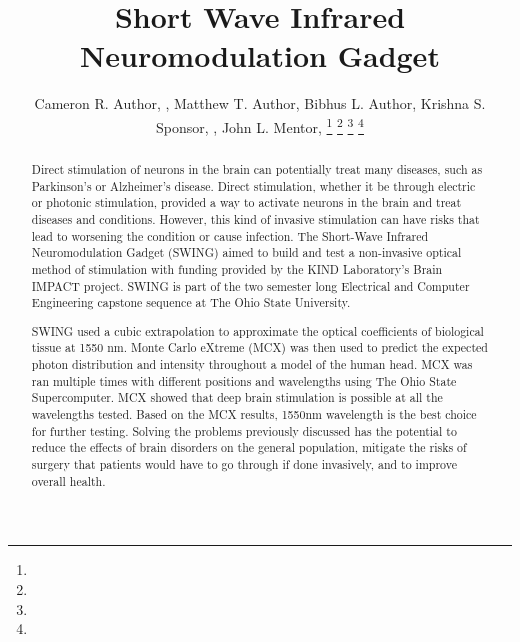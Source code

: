 \documentclass[journal,twoside,web]{ieeecolor}
\begin{document}
\title{Short Wave Infrared Neuromodulation Gadget}
\author{Cameron R. Author, , Matthew T. Author, Bibhus L. Author, 
        Krishna S. Sponsor, , John L. Mentor, 
\thanks{ }
\thanks{ }
\thanks{ }
\thanks{ }}

\maketitle

\begin{abstract}
    Direct stimulation of neurons in the brain can potentially treat many diseases, such as Parkinson's  
    or Alzheimer's disease. Direct stimulation, whether it be through electric or photonic stimulation,  
    provided a way to activate neurons in the brain and treat diseases and conditions. However, this kind  
    of invasive stimulation can have risks that lead to worsening the condition or cause infection.  
    The Short-Wave Infrared Neuromodulation Gadget (SWING) aimed to build and test a non-invasive optical method  
    of stimulation with funding provided by the KIND Laboratory's Brain IMPACT project. SWING is part of the  
    two semester long Electrical and Computer Engineering capstone sequence at The Ohio State University. 
    
    SWING used a cubic extrapolation to approximate the optical coefficients of biological tissue at 1550 nm. 
    Monte Carlo eXtreme (MCX) was then used to predict the expected photon distribution and intensity throughout a model of 
    the human head. MCX was ran multiple times with different positions and wavelengths using The Ohio State Supercomputer. 
    MCX showed that deep brain stimulation is possible at all the wavelengths tested. Based on the MCX results, 1550nm wavelength 
    is the best choice for further testing. Solving the problems previously discussed has the potential to reduce the effects of 
    brain disorders on the general population, mitigate the risks of surgery that patients would have to go through if done invasively, 
    and to improve overall health. 
\end{abstract}

\begin{IEEEkeywords}

\end{IEEEkeywords}
\end{document}
